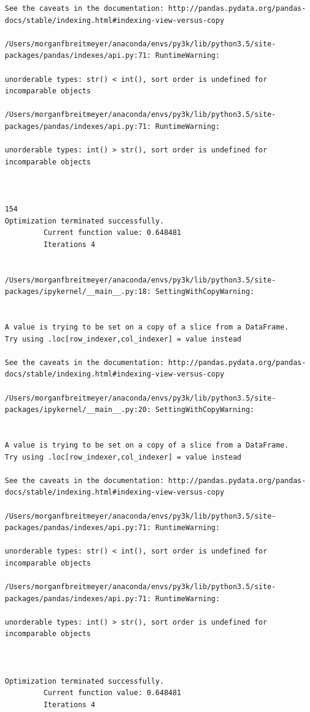\begin{lstlisting}
See the caveats in the documentation: http://pandas.pydata.org/pandas-docs/stable/indexing.html#indexing-view-versus-copy

/Users/morganfbreitmeyer/anaconda/envs/py3k/lib/python3.5/site-packages/pandas/indexes/api.py:71: RuntimeWarning:

unorderable types: str() < int(), sort order is undefined for incomparable objects

/Users/morganfbreitmeyer/anaconda/envs/py3k/lib/python3.5/site-packages/pandas/indexes/api.py:71: RuntimeWarning:

unorderable types: int() > str(), sort order is undefined for incomparable objects



154
Optimization terminated successfully.
         Current function value: 0.648481
         Iterations 4


/Users/morganfbreitmeyer/anaconda/envs/py3k/lib/python3.5/site-packages/ipykernel/__main__.py:18: SettingWithCopyWarning:


A value is trying to be set on a copy of a slice from a DataFrame.
Try using .loc[row_indexer,col_indexer] = value instead

See the caveats in the documentation: http://pandas.pydata.org/pandas-docs/stable/indexing.html#indexing-view-versus-copy

/Users/morganfbreitmeyer/anaconda/envs/py3k/lib/python3.5/site-packages/ipykernel/__main__.py:20: SettingWithCopyWarning:


A value is trying to be set on a copy of a slice from a DataFrame.
Try using .loc[row_indexer,col_indexer] = value instead

See the caveats in the documentation: http://pandas.pydata.org/pandas-docs/stable/indexing.html#indexing-view-versus-copy

/Users/morganfbreitmeyer/anaconda/envs/py3k/lib/python3.5/site-packages/pandas/indexes/api.py:71: RuntimeWarning:

unorderable types: str() < int(), sort order is undefined for incomparable objects

/Users/morganfbreitmeyer/anaconda/envs/py3k/lib/python3.5/site-packages/pandas/indexes/api.py:71: RuntimeWarning:

unorderable types: int() > str(), sort order is undefined for incomparable objects



Optimization terminated successfully.
         Current function value: 0.648481
         Iterations 4



\end{lstlisting}
